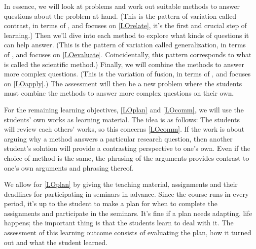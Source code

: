 In essence, we will look at problems and work out suitable methods to answer 
questions about the problem at hand.
(This is the pattern of variation called contrast, in terms of 
\cite{NecessaryConditionsOfLearning}, and focuses on \ref{LOrelate}, it's the 
first and crucial step of learning.)
Then we'll dive into each method to explore what kinds of questions it can help 
answer.
(This is the pattern of variation called generalization, in terms of 
\cite{NecessaryConditionsOfLearning}, and focuses on \ref{LOevaluate}.
Coincidentally, this pattern corresponds to what is called the scientific 
method.)
Finally, we will combine the methods to answer more complex questions.
(This is the variation of fusion, in terms of 
\cite{NecessaryConditionsOfLearning}, and focuses on \ref{LOapply}.)
The assessment will then be a new problem where the students must combine the 
methods to answer more complex questions on their own.

For the remaining learning objectives, \ref{LOplan} and \ref{LOcomm}, we will 
use the students' own works as learning material.
The idea is as follows:
The students will review each others' works, so this concerns \ref{LOcomm}.
If the work is about arguing why a method answers a particular research 
question, then another student's solution will provide a contrasting 
perspective to one's own.
Even if the choice of method is the same, the phrasing of the arguments 
provides contrast to one's own arguments and phrasing thereof.

We allow for \ref{LOplan} by giving the teaching material, assignments and 
their deadlines for participating in seminars in advance.
Since the course runs in every period, it's up to the student to make a plan 
for when to complete the assignments and participate in the seminars.
It's fine if a plan needs adapting, life happens; the important thing is that 
the students learn to deal with it.
The assessment of this learning outcome consists of evaluating the plan, how it 
turned out and what the student learned.


